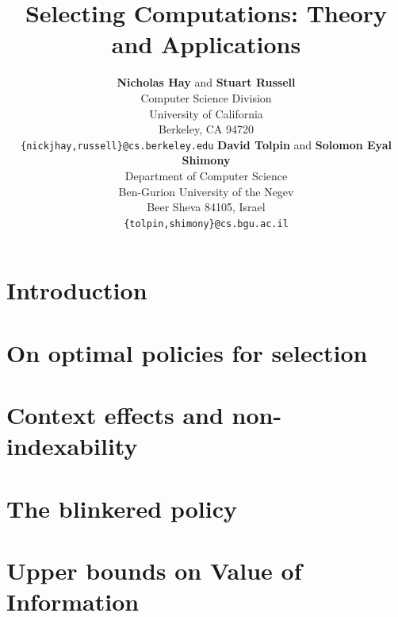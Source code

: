 \documentclass[]{article}
\title{Selecting Computations: Theory and Applications}
\author{ {\bf Nicholas Hay} and {\bf Stuart Russell} \\   
Computer Science Division \\  
University of California\\ 
Berkeley, CA 94720\\
\texttt{\{nickjhay,russell\}@cs.berkeley.edu}
\And 
{\bf David Tolpin} and {\bf Solomon Eyal Shimony} \\ 
Department of Computer Science \\ 
Ben-Gurion University of the Negev\\
Beer Sheva 84105, Israel\\
\texttt{\{tolpin,shimony\}@cs.bgu.ac.il}
}
\begin{document}
\maketitle 



\section{Introduction}




\section{On optimal policies for selection}\label{sec:optimal}




\section{Context effects and non-indexability}\label{sec:context}




\section{The blinkered policy}\label{sec:blinkered}\label{approx-bayesian-section}









  

\section{Upper bounds on Value of Information}\label{approx-nonbayesian-section}

\end{document}
